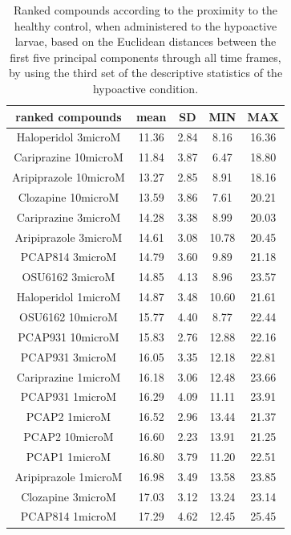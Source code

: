 \documentclass[a4paper,12pt]{article}
\begin{document}
\begin{table}[h!]\tiny
\centering
\caption{Ranked compounds according to the proximity to the healthy control, when administered to the hypoactive larvae, based on the Euclidean distances between the first five principal components through all time frames, by using the third set of the descriptive statistics of the hypoactive condition.}
\begin{tabular}{|c|c|c|c|c|}
\hline
ranked compounds             & mean & SD   & MIN  & MAX   \\ \hline
Haloperidol 3microM   & 11.36 & 2.84  & 8.16  & 16.36 \\ \hline
Cariprazine 10microM  & 11.84 & 3.87  & 6.47  & 18.80  \\ \hline
Aripiprazole 10microM & 13.27 & 2.85  & 8.91  & 18.16 \\ \hline
Clozapine 10microM    & 13.59 & 3.86  & 7.61  & 20.21 \\ \hline
Cariprazine 3microM   & 14.28 & 3.38  & 8.99  & 20.03 \\ \hline
Aripiprazole 3microM  & 14.61 & 3.08  & 10.78 & 20.45 \\ \hline
PCAP814 3microM       & 14.79 & 3.60   & 9.89  & 21.18 \\ \hline
OSU6162 3microM       & 14.85 & 4.13  & 8.96  & 23.57 \\ \hline
Haloperidol 1microM   & 14.87 & 3.48  & 10.60  & 21.61 \\ \hline
OSU6162 10microM      & 15.77 & 4.40   & 8.77  & 22.44 \\ \hline
PCAP931 10microM      & 15.83 & 2.76  & 12.88 & 22.16 \\ \hline
PCAP931 3microM       & 16.05 & 3.35  & 12.18 & 22.81 \\ \hline
Cariprazine 1microM   & 16.18 & 3.06  & 12.48 & 23.66 \\ \hline
PCAP931 1microM       & 16.29 & 4.09  & 11.11 & 23.91 \\ \hline
PCAP2 1microM         & 16.52 & 2.96  & 13.44 & 21.37 \\ \hline
PCAP2 10microM        & 16.60  & 2.23  & 13.91 & 21.25 \\ \hline
PCAP1 1microM         & 16.80  & 3.79  & 11.20  & 22.51 \\ \hline
Aripiprazole 1microM  & 16.98 & 3.49  & 13.58 & 23.85 \\ \hline
Clozapine 3microM     & 17.03 & 3.12  & 13.24 & 23.14 \\ \hline
PCAP814 1microM       & 17.29 & 4.62  & 12.45 & 25.45 \\ \hline

\end{tabular}
\end{table}
\end{document}
